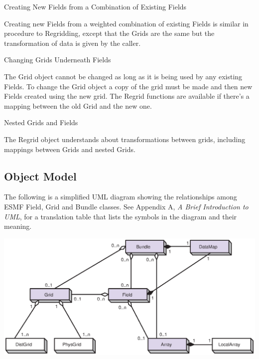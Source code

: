 \begin{description}
\item{Creating New Fields from a Combination of Existing Fields}

Creating new Fields from a weighted combination of existing
Fields is similar in procedure to Regridding, except that the
Grids are the same but the transformation of data is given 
by the caller.

\item{Changing Grids Underneath Fields}

The Grid object cannot be changed as long as it is being used
by any existing Fields.  To change the Grid object a copy of
the grid must be made and then new Fields created using the
new grid.  The Regrid functions are available if there's a 
mapping between the old Grid and the new one.

\item{Nested Grids and Fields}

The Regrid object understands about transformations between
grids, including mappings between Grids and nested Grids.

\end{description}

\newpage
\subsection{Object Model}

The following is a simplified UML diagram showing the relationships among
ESMF Field, Grid and Bundle classes.  See Appendix A, {\it A Brief 
Introduction to UML},
for a translation table that lists the symbols in the diagram and their 
meaning.

\begin{center}
\includegraphics{Bundle_obj.eps}   
\end{center}

